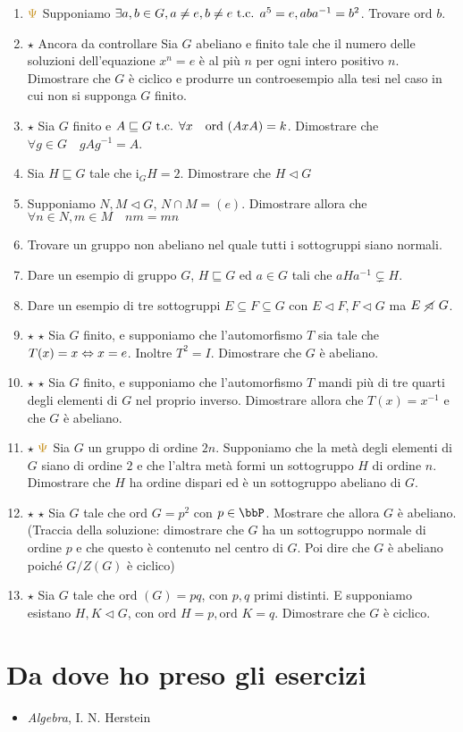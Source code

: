 \documentclass[a4paper,NoNotes,GeneralMath]{stdmdoc}
\newcommand{\Ord}{\text{ord }}
\newcommand{\sgr}{\sqsubseteq}
\newcommand{\nrm}{\lhd}
\newcommand{\ctrl}{{\color{blue} Ancora da controllare }}
\newcommand{\Ind}{\text{i}}
\newcommand{\Star}{$\star$ }
\newcommand{\Gpsi}{${\color{gold}\Psi}$ }
\newcommand\nnrm{\mathrel{\ooalign{\hss$\diagup$\hss\cr$\lhd$}}}
\begin{document}
\begin{enumerate}
		\item \Gpsi Supponiamo $\exists a,b \in G, a \neq e, b \neq e \mbox{ t.c. } a^5 = e, aba^{-1} = b^2$. Trovare $\Ord b$.
		\item \Star \ctrl Sia $G$ abeliano e finito tale che il numero delle soluzioni dell'equazione $x^n = e$ è al più $n$ per ogni intero positivo $n$. Dimostrare che $G$ è ciclico e produrre un controesempio alla tesi nel caso in cui non si supponga $G$ finito.
		\item \Star Sia $G$ finito e $A \sgr G \tc \forall x \quad \Ord(AxA) = k$. Dimostrare che $\forall g\in G \quad gAg^{-1} = A$.
		\item Sia $H \sgr G$ tale che $\Ind_G H = 2$. Dimostrare che $H \nrm G$
		\item Supponiamo $N, M \nrm G$, $N \cap M = (e)$. Dimostrare allora che $\forall n\in N, m\in M \quad nm = mn$
		\item Trovare un gruppo non abeliano nel quale tutti i sottogruppi siano normali. 
		\item Dare un esempio di gruppo $G$, $H \sgr G$ ed $a \in G$ tali che $aHa^{-1} \subsetneq H$.
		\item Dare un esempio di tre sottogruppi $E \subseteq F \subseteq G$ con $E \nrm F, F \nrm G$ ma $E \nnrm G$.
		\item \Star \Star Sia $G$ finito, e supponiamo che l'automorfismo $T$ sia tale che $T(x) = x \Leftrightarrow x = e$. Inoltre $T^2 = I$. Dimostrare che $G$ è abeliano.
		\item \Star \Star Sia $G$ finito, e supponiamo che l'automorfismo $T$ mandi più di tre quarti degli elementi di $G$ nel proprio inverso. Dimostrare allora che $T(x) = x^{-1}$ e che $G$ è abeliano.
		\item \Star \Gpsi Sia $G$ un gruppo di ordine $2n$. Supponiamo che la metà degli elementi di $G$ siano di ordine $2$ e che l'altra metà formi un sottogruppo $H$ di ordine $n$. Dimostrare che $H$ ha ordine dispari ed è un sottogruppo abeliano di $G$.
		\item \Star \Star Sia $G$ tale che $\Ord G = p^2$ con $p \in \bbP$. Mostrare che allora $G$ è abeliano. (Traccia della soluzione: dimostrare che $G$ ha un sottogruppo normale di ordine $p$ e che questo è contenuto nel centro di $G$. Poi dire che $G$ è abeliano poiché $G/Z(G)$ è ciclico)
		\item \Star Sia $G$ tale che $\Ord(G) = pq$, con $p, q$ primi distinti. E supponiamo esistano $H, K \nrm G$, con $\Ord H = p, \Ord K = q$. Dimostrare che $G$ è ciclico.
	\end{enumerate}

	\section*{Da dove ho preso gli esercizi}
	\begin{itemize}
		\item {\it Algebra}, I. N. Herstein
	\end{itemize}
\end{document}
